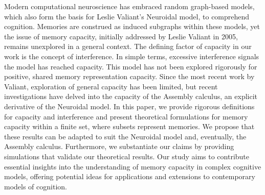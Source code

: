 Modern computational neuroscience has embraced random graph-based models, which also form the basis for Leslie Valiant's Neuroidal model, to comprehend cognition. Memories are construed as induced subgraphs within these models, yet the issue of memory capacity, initially addressed by Leslie Valiant in 2005, remains unexplored in a general context. The defining factor of capacity in our work is the concept of interference. In simple terms, excessive interference signals the model has reached capacity. This model has not been explored rigorously for positive, shared memory representation capacity. Since the most recent work by Valiant, exploration of general capacity has been limited, but recent investigations have delved into the capacity of the Assembly calculus, an explicit derivative of the Neuroidal model. In this paper, we provide rigorous definitions for capacity and interference and present theoretical formulations for memory capacity within a finite set, where subsets represent memories. We propose that these results can be adapted to suit the Neuroidal model and, eventually, the Assembly calculus. Furthermore, we substantiate our claims by providing simulations that validate our theoretical results. Our study aims to contribute essential insights into the understanding of memory capacity in complex cognitive models, offering potential ideas for applications and extensions to contemporary models of cognition. 
